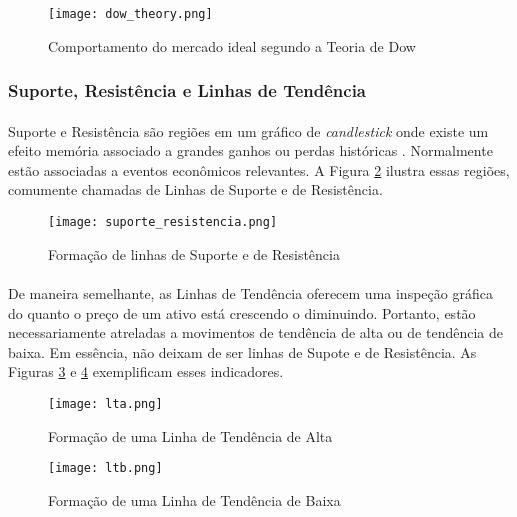 \begin{figure}[h]
    \texttt{[image: dow\_theory.png]}
    \centering
    \caption{Comportamento do mercado ideal segundo a Teoria de Dow \cite{kirkpatrick2010technical}}
    \label{fig:2}
\end{figure}



\FloatBarrier
\subsubsection*{Suporte, Resistência e Linhas de Tendência}

\paragraph{} Suporte e Resistência são regiões em um gráfico de \textit{candlestick} onde existe um efeito memória associado a grandes ganhos ou perdas históricas \cite{moraes2007se}. Normalmente estão associadas a eventos econômicos relevantes. A Figura \ref{fig:3} ilustra essas regiões, comumente chamadas de Linhas de Suporte e de Resistência.

\begin{figure}[h]
    \texttt{[image: suporte\_resistencia.png]}
    \centering
    \caption{Formação de linhas de Suporte e de Resistência \cite{moraes2007se}}
    \label{fig:3}
\end{figure}

\paragraph{} De maneira semelhante, as Linhas de Tendência oferecem uma inspeção gráfica do quanto o preço de um ativo está crescendo o diminuindo. Portanto, estão necessariamente atreladas a movimentos de tendência de alta ou de tendência de baixa. Em essência, não deixam de ser linhas de Supote e de Resistência. As Figuras \ref{fig:4} e \ref{fig:5} exemplificam esses indicadores.

\begin{figure}[h]
    \texttt{[image: lta.png]}
    \centering
    \caption{Formação de uma Linha de Tendência de Alta \cite{moraes2007se}}
    \label{fig:4}
\end{figure}

\begin{figure}[h]
    \texttt{[image: ltb.png]}
    \centering
    \caption{Formação de uma Linha de Tendência de Baixa \cite{moraes2007se}}
    \label{fig:5}
\end{figure}



